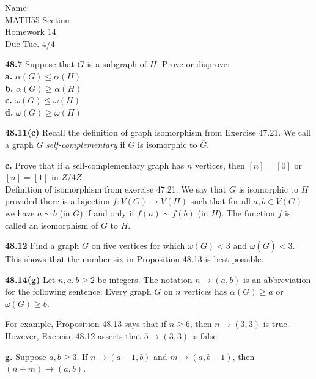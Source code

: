 \documentclass[10pt]{article}
\begin{document}
\begin{flushright}
	Name: \underline{\hspace{3cm}} \\
	MATH55 Section \underline{\hspace{0.5cm}} \\
	Homework 14 \\
	Due Tue. 4/4
\end{flushright}


\begin{framed}
	\textbf{48.7} Suppose that $G$ is a subgraph of $H$. Prove or disprove:\\
	\indent \textbf{a.} $\alpha(G) \leq \alpha(H)$\\
	\indent \textbf{b.} $\alpha(G) \geq \alpha(H)$\\
	\indent \textbf{c.} $\omega(G) \leq \omega(H)$\\
	\indent \textbf{d.} $\omega(G) \geq \omega(H)$
\end{framed}

\pagebreak

\begin{framed}
	\textbf{48.11(c)} Recall the definition of graph isomorphism from Exercise 47.21. 
	We call a graph $G$ \textit{self-complementary} if $G$ is isomorphic to $\overline{G}$.

	\textbf{c.} Prove that if a self-complementary graph has $n$ vertices, then $[n] = [0]$ or $[n] = [1]$
	in $Z/4Z$.\\

	Definition of isomorphism from exercise 47.21: 
	We say that $G$ is isomorphic to $H$ provided there is a bijection $f: V(G) \rightarrow V(H)$ 
	such that for all $a, b \in V(G)$ we have $a \sim b$ (in $G$) if and only if $f(a) \sim f(b)$ (in $H$). 
	The function $f$ is called an isomorphism of $G$ to $H$.
\end{framed}

\pagebreak

\begin{framed}
	\textbf{48.12} Find a graph $G$ on five vertices for which $\omega(G) < 3$ and $\omega(\overline{G}) < 3$. 
	This shows that the number six in Proposition 48.13 is best possible.
\end{framed}

\pagebreak

\begin{framed}
	\textbf{48.14(g)} Let $n, a, b \geq 2$ be integers. The notation $n \rightarrow (a,b)$ 
	is an abbreviation for the following sentence:
	Every graph $G$ on $n$ vertices has $\alpha(G) \geq a$ or $\omega(G) \geq b$.

	For example, Proposition 48.13 says that if $n \geq 6$, then $n \rightarrow (3,3)$ is true. 
	However, Exercise 48.12 asserts that $5 \rightarrow (3,3)$ is false.

	\textbf{g.} Suppose $a,b \geq 3$.
	If $n \rightarrow (a-1, b)$ and $m \rightarrow (a, b-1)$, then $(n+m) \rightarrow (a,b)$.
\end{framed}
\end{document}
